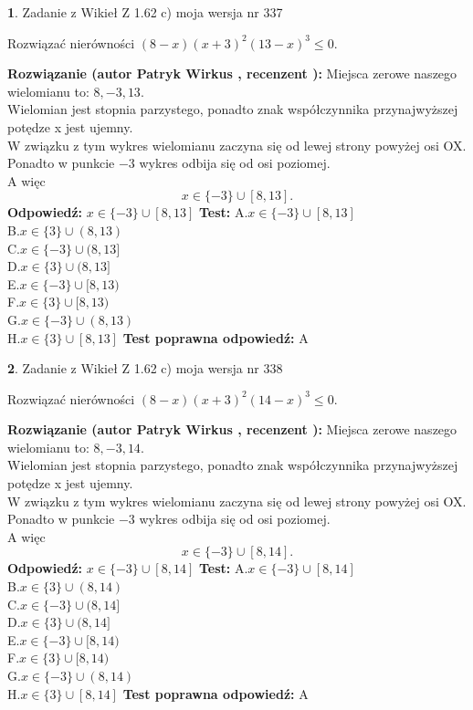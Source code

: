 \documentclass[12pt, a4paper]{article}
\theoremstyle{definition} %
\newtheorem{zad}{}
\newcommand{\zadStart}[1]{\begin{zad}#1\newline}
\newcommand{\zadStop}{\end{zad}}
\newcommand{\rozwStart}[2]{\noindent \textbf{Rozwiązanie (autor #1 , recenzent #2): }\newline}
\newcommand{\rozwStop}{\newline}
\newcommand{\odpStart}{\noindent \textbf{Odpowiedź:}\newline}
\newcommand{\odpStop}{\newline}
\newcommand{\testStart}{\noindent \textbf{Test:}\newline}
\newcommand{\testStop}{\newline}
\newcommand{\kluczStart}{\noindent \textbf{Test poprawna odpowiedź:}\newline}
\newcommand{\kluczStop}{\newline}
\begin{document}
\zadStart{Zadanie z Wikieł Z 1.62 c) moja wersja nr 337}

Rozwiązać nierówności $(8-x)(x+3)^{2}(13-x)^{3}\le0$.
\zadStop
\rozwStart{Patryk Wirkus}{}
Miejsca zerowe naszego wielomianu to: $8, -3, 13$.\\
Wielomian jest stopnia parzystego, ponadto znak współczynnika przy\linebreak najwyższej potędze x jest ujemny.\\ W związku z tym wykres wielomianu zaczyna się od lewej strony powyżej osi OX.\\
Ponadto w punkcie $-3$ wykres odbija się od osi poziomej.\\
A więc $$x \in \{-3\} \cup [8,13].$$
\rozwStop
\odpStart
$x \in \{-3\} \cup [8,13]$
\odpStop
\testStart
A.$x \in \{-3\} \cup [8,13]$\\
B.$x \in \{3\} \cup (8,13)$\\
C.$x \in \{-3\} \cup (8,13]$\\
D.$x \in \{3\} \cup (8,13]$\\
E.$x \in \{-3\} \cup [8,13)$\\
F.$x \in \{3\} \cup [8,13)$\\
G.$x \in \{-3\} \cup (8,13)$\\
H.$x \in \{3\} \cup [8,13]$
\testStop
\kluczStart
A
\kluczStop



\zadStart{Zadanie z Wikieł Z 1.62 c) moja wersja nr 338}

Rozwiązać nierówności $(8-x)(x+3)^{2}(14-x)^{3}\le0$.
\zadStop
\rozwStart{Patryk Wirkus}{}
Miejsca zerowe naszego wielomianu to: $8, -3, 14$.\\
Wielomian jest stopnia parzystego, ponadto znak współczynnika przy\linebreak najwyższej potędze x jest ujemny.\\ W związku z tym wykres wielomianu zaczyna się od lewej strony powyżej osi OX.\\
Ponadto w punkcie $-3$ wykres odbija się od osi poziomej.\\
A więc $$x \in \{-3\} \cup [8,14].$$
\rozwStop
\odpStart
$x \in \{-3\} \cup [8,14]$
\odpStop
\testStart
A.$x \in \{-3\} \cup [8,14]$\\
B.$x \in \{3\} \cup (8,14)$\\
C.$x \in \{-3\} \cup (8,14]$\\
D.$x \in \{3\} \cup (8,14]$\\
E.$x \in \{-3\} \cup [8,14)$\\
F.$x \in \{3\} \cup [8,14)$\\
G.$x \in \{-3\} \cup (8,14)$\\
H.$x \in \{3\} \cup [8,14]$
\testStop
\kluczStart
A
\kluczStop
\end{document}
